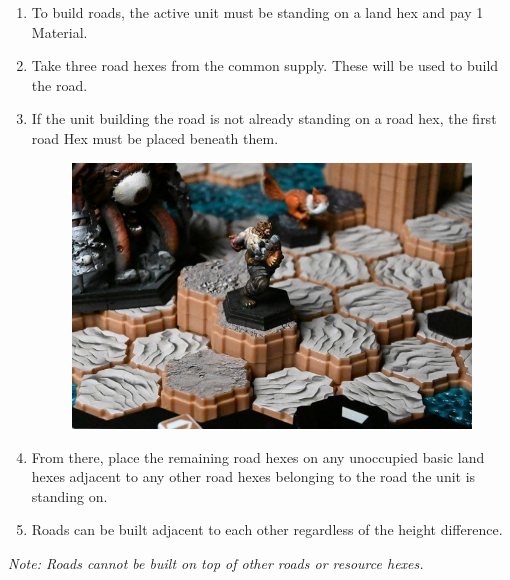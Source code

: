 \documentclass[../main.tex]{subfiles}
\begin{document}
\begin{enumerate}
    \item To build roads, the active unit must be standing on a land hex and pay 1 Material.
    \item Take three road hexes from the common supply. These will be used to build the road.
    \item If the unit building the road is not already standing on a road hex, the first road Hex must be placed beneath them. 
    \begin{figure}[h]
        \centering
        \includegraphics[width=1\linewidth]{chapters//Building/TimeStrikeBuildingRoads.jpg}
    \end{figure}
    \item From there, place the remaining road hexes on any unoccupied basic land hexes adjacent to any other road hexes belonging to the road the unit is standing on.
    \item Roads can be built adjacent to each other regardless of the height difference.
\end{enumerate}

\textit{Note: Roads cannot be built on top of other roads or resource hexes.}

\clearpage
\end{document}
